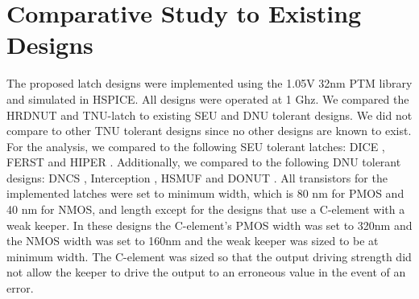 \section{Comparative Study to Existing Designs} \label{sec:res}

The proposed latch designs were implemented using the 1.05V 32nm PTM library \cite{PTM} and simulated in HSPICE.  All designs were operated at 1 Ghz. We compared the HRDNUT and TNU-latch to existing SEU and DNU tolerant designs. We did not compare to other TNU tolerant designs since no other designs are known to exist. For the analysis, we compared to the following SEU tolerant latches: DICE \cite{DICE}, FERST \cite{FERST} and HIPER \cite{HIPER}. Additionally, we compared to the following DNU tolerant designs: DNCS \cite{DNCS}, Interception \cite{Inter}, HSMUF \cite{HSMUF} and DONUT \cite{DONUT}. All transistors for the implemented latches were set to minimum width, which is 80 nm for PMOS and 40 nm for NMOS, and length except for the designs that use a C-element with a weak keeper. In these designs the C-element's PMOS width was set to 320nm and the NMOS width was set to 160nm and the weak keeper was sized to be at minimum width. The C-element was sized so that the output driving strength did not allow the keeper to drive the output to an erroneous value in the event of an error. 

